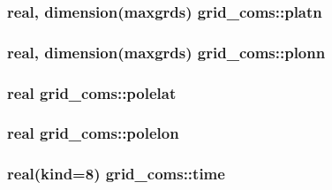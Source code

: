 \subsubsection[{\texorpdfstring{platn}{platn}}]{\setlength{\rightskip}{0pt plus 5cm}real, dimension(maxgrds) grid\+\_\+coms\+::platn}\hypertarget{namespacegrid__coms_adeea6f966fb6ad97de70d6d4f27e273c}{}\label{namespacegrid__coms_adeea6f966fb6ad97de70d6d4f27e273c}
\subsubsection[{\texorpdfstring{plonn}{plonn}}]{\setlength{\rightskip}{0pt plus 5cm}real, dimension(maxgrds) grid\+\_\+coms\+::plonn}\hypertarget{namespacegrid__coms_aeb6e6ef8eced0c1e67af7b80cead352c}{}\label{namespacegrid__coms_aeb6e6ef8eced0c1e67af7b80cead352c}
\subsubsection[{\texorpdfstring{polelat}{polelat}}]{\setlength{\rightskip}{0pt plus 5cm}real grid\+\_\+coms\+::polelat}\hypertarget{namespacegrid__coms_a332ff2495f60062e9fa9f90035dc8cd3}{}\label{namespacegrid__coms_a332ff2495f60062e9fa9f90035dc8cd3}
\subsubsection[{\texorpdfstring{polelon}{polelon}}]{\setlength{\rightskip}{0pt plus 5cm}real grid\+\_\+coms\+::polelon}\hypertarget{namespacegrid__coms_ad1ae0e93c1ba39b88b6e957547176e8a}{}\label{namespacegrid__coms_ad1ae0e93c1ba39b88b6e957547176e8a}
\subsubsection[{\texorpdfstring{time}{time}}]{\setlength{\rightskip}{0pt plus 5cm}real(kind=8) grid\+\_\+coms\+::time}\hypertarget{namespacegrid__coms_a620c7c9f9699aec60464ae63865bd8bc}{}\label{namespacegrid__coms_a620c7c9f9699aec60464ae63865bd8bc}
